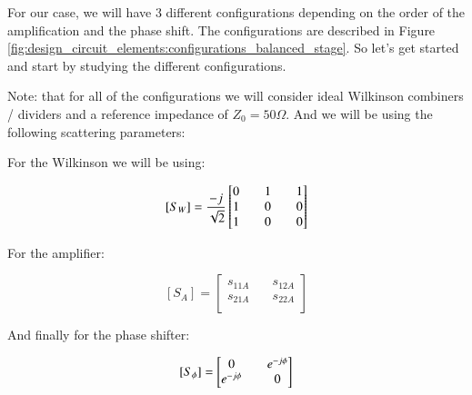 \documentclass[12pt]{report} %
\begin{document}
For our case, we will have 3 different configurations depending on the order of the amplification and the phase shift. The configurations are described in Figure \ref{fig:design_circuit_elements:configurations_balanced_stage}. So let's get started and start by studying the different configurations.

Note: that for all of the configurations we will consider ideal Wilkinson combiners / dividers and a reference impedance of $Z_0 = 50 \Omega$. And we will be using the following scattering parameters:

For the Wilkinson we will be using: 

\[
[S_W] = \frac{-j}{\sqrt{2}} \* \begin{bmatrix}
0 & \quad 1 & \quad 1 \\
1 & \quad 0 & \quad 0 \\
1 & \quad 0 & \quad 0 \\
\end{bmatrix}
\]

For the amplifier:

\[
[S_A] = \begin{bmatrix}
s_{11A} & \quad s_{12A} \\
s_{21A} & \quad s_{22A} \\
\end{bmatrix}
\]

And finally for the phase shifter:

\[
[S_{\phi}] = \begin{bmatrix}
0 & \quad e^{-j \* \phi} \\
e^{-j \* \phi} & \quad 0 \\
\end{bmatrix}
\]
\end{document}
